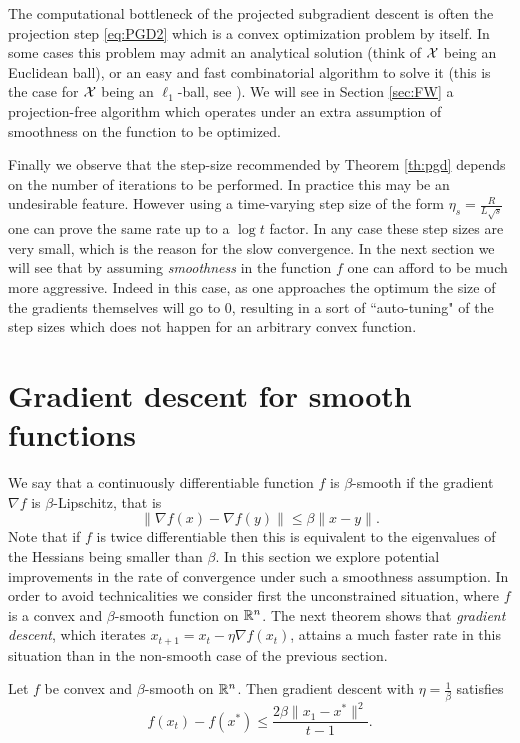 The computational bottleneck of the projected subgradient descent is often the projection step \eqref{eq:PGD2} which is a convex optimization problem by itself. In some cases this problem may admit an analytical solution (think of $\mathcal{X}$ being an Euclidean ball), or an easy and fast combinatorial algorithm to solve it (this is the case for $\mathcal{X}$ being an $\ell_1$-ball, see \cite{MP89}). We will see in Section \ref{sec:FW} a projection-free algorithm which operates under an extra assumption of smoothness on the function to be optimized.

Finally we observe that the step-size recommended by Theorem \ref{th:pgd} depends on the number of iterations to be performed. In practice this may be an undesirable feature. However using a time-varying step size of the form $\eta_s = \frac{R}{L \sqrt{s}}$ one can prove the same rate up to a $\log t$ factor. In any case these step sizes are very small, which is the reason for the slow convergence. In the next section we will see that by assuming {\em smoothness} in the function $f$ one can afford to be much more aggressive. Indeed in this case, as one approaches the optimum the size of the gradients themselves will go to $0$, resulting in a sort of ``auto-tuning" of the step sizes which does not happen for an arbitrary convex function.

\section{Gradient descent for smooth functions} \label{sec:gdsmooth}
We say that a continuously differentiable function $f$ is $\beta$-smooth if the gradient $\nabla f$ is $\beta$-Lipschitz, that is 
$$\|\nabla f(x) - \nabla f(y) \| \leq \beta \|x-y\| .$$
Note that if $f$ is twice differentiable then this is equivalent to the eigenvalues of the Hessians being smaller than $\beta$.
In this section we explore potential improvements in the rate of convergence under such a smoothness assumption.
In order to avoid technicalities we consider first the unconstrained situation, where $f$ is a convex and $\beta$-smooth function on $\mathbb{R}^n$. 
The next theorem shows that {\em gradient descent}, which iterates $x_{t+1} = x_t - \eta \nabla f(x_t)$, attains a much faster rate in this situation than in the non-smooth case of the previous section.

\begin{theorem} \label{th:gdsmooth}
Let $f$ be convex and $\beta$-smooth on $\mathbb{R}^n$. 
Then gradient descent with $\eta = \frac{1}{\beta}$ satisfies
$$f(x_t) - f(x^*) \leq \frac{2 \beta \|x_1 - x^*\|^2}{t-1} .$$
\end{theorem}

